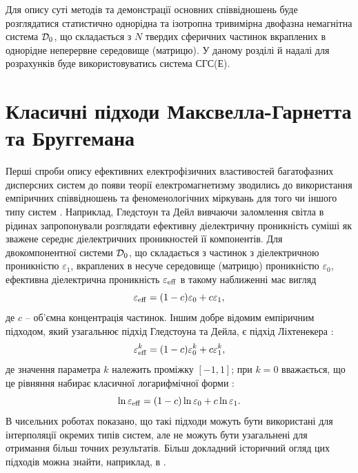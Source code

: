 \documentclass[14pt,twoside]{vakthesis}
\begin{document}
Для опису суті методів та демонстрації основних співвідношень буде розглядатися статистично однорідна та ізотропна тривимірна двофазна немагнітна система ${\cal D}_0$, що складається з $N$ твердих сферичних частинок вкраплених в однорідне неперервне середовище (матрицю).
У даному розділі й надалі для розрахунків буде використовуватись система СГС(Е). 


\section{Класичні підходи Максвелла-Гарнетта та Бруггемана}\label{sec:Bruggeman}

Перші спроби опису ефективних електрофізичних властивостей багатофазних дисперсних систем до появи теорії електромагнетизму зводились до використання емпіричних співвідношень та феноменологічних міркувань для того чи іншого типу систем \cite{Priou}.
Наприклад, Гледстоун та Дейл \cite{Gladstone1863} вивчаючи заломлення світла в рідинах запропонували розглядати ефективну діелектричну проникність суміші як зважене середнє діелектричних проникностей її компонентів. Для двокомпонентної системи ${\cal D}_0$, що складається з частинок з діелектричною проникністю $\varepsilon_1$, вкраплених в несуче середовище (матрицю) проникністю $\varepsilon_0$, ефективна діелектрична проникність $\varepsilon_{\rm eff}$ в такому наближенні має вигляд
$$
\varepsilon_{\rm eff} = (1-c) \varepsilon_0 + c \varepsilon_1,
$$
де $c$ -- об'ємна концентрація частинок.
Іншим добре відомим емпіричним підходом, який узагальнює підхід Глед\-стоуна та Дейла, є підхід Ліхтенекера \cite{Licht1926, Goncharenko2000}:
\begin{equation}\label{eq:licht-k}
\varepsilon_{\rm eff}^k = (1-c) \varepsilon_0^k + c \varepsilon_1^k,
\end{equation}
де значення параметра $k$ належить проміжку $[-1,1]$; при $k=0$ вважається, що це рівняння набирає класичної логарифмічної форми \cite{Licht1926, Simpkin2010}:
\begin{equation}\label{eq:licht-ln}
\ln \varepsilon_{\rm eff} = (1-c) \ln \varepsilon_0 + c \ln \varepsilon_1.
\end{equation}
В чисельних роботах \cite{Sheng, BergmanB, Sihvola1999, Brosseau2003} показано, що такі підходи можуть бути використані для інтерполяції окремих типів систем, але не можуть бути узагальнені для отримання більш точних результатів. Більш докладний історичний огляд цих підходів можна знайти, наприклад, в \cite{Brosseau2006}.
\end{document}
